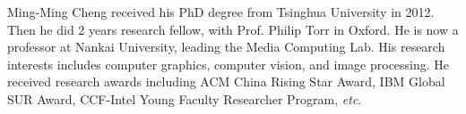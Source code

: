 \documentclass[journal]{IEEEtran}
\def\etc{\emph{etc}}
\begin{document}
\begin{IEEEbiography}
{Ming-Ming Cheng } received his PhD degree
from Tsinghua University in 2012. Then he did 2
years research fellow, with Prof. Philip Torr in Oxford.
He is now a professor at Nankai University,
leading the Media Computing Lab. His research
interests includes computer graphics, computer
vision, and image processing. He received research
awards including ACM China Rising Star
Award, IBM Global SUR Award, CCF-Intel Young
Faculty Researcher Program, \etc.
\end{IEEEbiography}




\vfill
\end{document}
